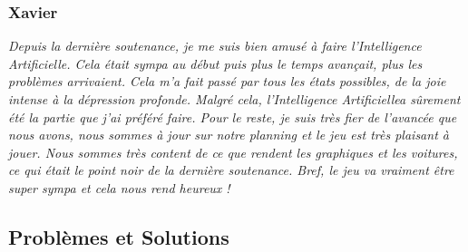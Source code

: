 \documentclass[12pt,a4paper]{article}
\newcommand{\AI}{Intelligence Artificielle}
\begin{document}
            \subsubsection{Xavier}
                \textit{Depuis la dernière soutenance, je me suis bien amusé à faire l'\AI.
                Cela était sympa au début puis plus le temps avançait, plus les problèmes arrivaient.
                Cela m'a fait passé par tous les états possibles, de la joie intense à la dépression
                profonde. Malgré cela, l'\AI a sûrement été la partie que j'ai préféré faire.
                Pour le reste, je suis très fier de l'avancée que nous avons, nous sommes à jour sur 
                notre planning et le jeu est très plaisant à jouer. Nous sommes très content de ce que 
                rendent les graphiques et les voitures, ce qui était le point noir de la dernière 
                soutenance. Bref, le jeu va vraiment être super sympa et cela nous rend heureux ! }


        \clearpage
        \subsection{Problèmes et Solutions}
\end{document}
